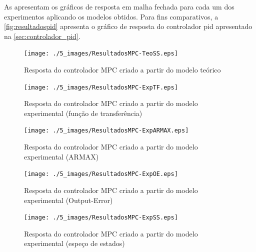 As  apresentam os gráficos de resposta em malha fechada
para cada um dos experimentos aplicando os modelos obtidos. Para fins comparativos, a \cref{fig:resultadospid}
apresenta o gráfico de resposta do controlador \acrshort{pid} apresentado na \cref{sec:controlador_pid}.

\begin{figure}[!h]
	\caption{Resposta do controlador MPC criado a partir do modelo teórico}
	\begin{center}
		\texttt{[image: ./5\_images/ResultadosMPC-TeoSS.eps]} 
		\label{fig:resultadosmpc-teoss}
	\end{center}
	\centering
\end{figure}

\begin{figure}[!h]
	\caption{Resposta do controlador MPC criado a partir do modelo experimental (função de transferência)}
	\begin{center}
		\texttt{[image: ./5\_images/ResultadosMPC-ExpTF.eps]} 
		\label{fig:resultadosmpc-exptf}
	\end{center}
	\centering
\end{figure}

\begin{figure}[!h]
	\caption{Resposta do controlador MPC criado a partir do modelo experimental (ARMAX)}
	\begin{center}
		\texttt{[image: ./5\_images/ResultadosMPC-ExpARMAX.eps]} 
		\label{fig:resultadosmpc-exparmax}
	\end{center}
	\centering
\end{figure}

\begin{figure}[!h]
	\caption{Resposta do controlador MPC criado a partir do modelo experimental (Output-Error)}
	\begin{center}
		\texttt{[image: ./5\_images/ResultadosMPC-ExpOE.eps]} 
		\label{fig:resultadosmpc-expoe}
	\end{center}
	\centering
\end{figure}

\begin{figure}[!h]
	\caption{Resposta do controlador MPC criado a partir do modelo experimental (espeço de estados)}
	\begin{center}
		\texttt{[image: ./5\_images/ResultadosMPC-ExpSS.eps]} 
		\label{fig:resultadosmpc-expss}
	\end{center}
	\centering
\end{figure}

